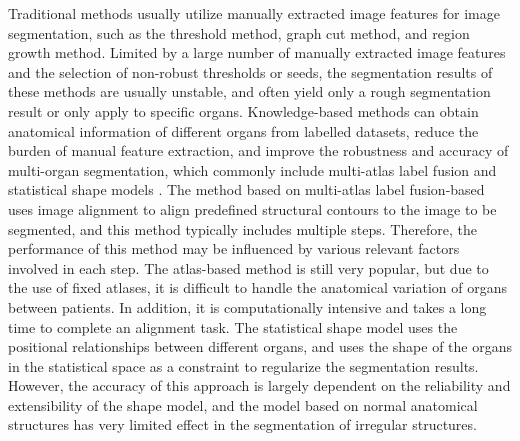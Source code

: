\documentclass[lettersize,journal]{IEEEtran}
\begin{document}
Traditional methods \cite{10,11,12,13} usually utilize manually extracted image features for image segmentation, such as the threshold \cite{14} method, graph cut \cite{15} method, and region growth \cite{16} method. Limited by a large number of manually extracted image features and the selection of non-robust thresholds or seeds, the segmentation results of these methods are usually unstable, and often yield only a rough segmentation result or only apply to specific organs. Knowledge-based methods can obtain anatomical information of different organs from labelled datasets, reduce the burden of manual feature extraction, and improve the robustness and accuracy of multi-organ segmentation, which commonly include multi-atlas label fusion \cite{17,18} and statistical shape models \cite{19,20}. The method based on multi-atlas label fusion-based uses image alignment to align predefined structural contours to the image to be segmented, and this method typically includes multiple steps. Therefore, the performance of this method may be influenced by various relevant factors involved in each step. The atlas-based method is still very popular, but due to the use of fixed atlases, it is difficult to handle the anatomical variation of organs between patients. In addition, it is computationally intensive and takes a long time to complete an alignment task. The statistical shape model uses the positional relationships between different organs, and uses the shape of the organs in the statistical space as a constraint to regularize the segmentation results. However, the accuracy of this approach is largely dependent on the reliability and extensibility of the shape model, and  the model based on normal anatomical structures has  very limited effect  in the segmentation of irregular structures.
\end{document}
